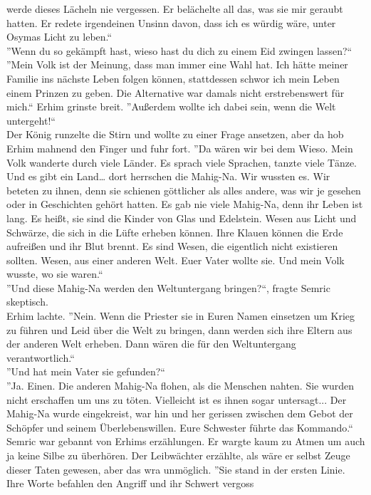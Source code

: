 werde dieses Lächeln nie vergessen. Er belächelte all das, was sie mir geraubt hatten. Er redete 
irgendeinen Unsinn davon, dass ich es würdig wäre, unter Osymas Licht zu leben.``\\
''Wenn du so gekämpft hast, wieso hast du dich zu einem Eid zwingen lassen?``\\
''Mein Volk ist der Meinung, dass man immer eine Wahl hat. Ich hätte meiner Familie ins nächste 
Leben 
folgen können, stattdessen schwor ich mein Leben einem Prinzen zu geben. Die Alternative war damals 
nicht erstrebenswert für mich.`` Erhim grinste breit. ''Außerdem wollte ich dabei sein, wenn die 
Welt 
untergeht!``\\
Der König runzelte die Stirn und wollte zu einer Frage ansetzen, aber da hob Erhim mahnend den 
Finger und fuhr fort. ''Da wären wir bei dem Wieso. Mein Volk wanderte durch viele Länder. Es 
sprach 
viele Sprachen, tanzte viele Tänze. Und es gibt ein Land… dort herrschen die Mahig-Na. Wir wussten 
es. Wir beteten zu ihnen, denn sie schienen göttlicher als alles andere, was wir je gesehen oder in 
Geschichten gehört hatten. Es gab nie viele Mahig-Na, denn ihr Leben ist lang. Es heißt, sie sind 
die Kinder von Glas und Edelstein. Wesen aus Licht und Schwärze, die sich in die Lüfte erheben 
können. Ihre Klauen können die Erde aufreißen und ihr Blut brennt. Es sind Wesen, die eigentlich 
nicht existieren sollten. Wesen, aus einer anderen Welt. Euer Vater wollte sie. Und mein Volk 
wusste, wo sie waren.``\\
''Und diese Mahig-Na werden den Weltuntergang bringen?``, fragte Semric skeptisch.\\
Erhim lachte. ''Nein. Wenn die Priester sie in Euren Namen einsetzen um Krieg zu führen und Leid 
über 
die Welt zu bringen, dann werden sich ihre Eltern aus der anderen Welt erheben. Dann wären die für 
den Weltuntergang verantwortlich.``\\
''Und hat mein Vater sie gefunden?``\\
''Ja. Einen. Die anderen Mahig-Na flohen, als die Menschen nahten. Sie wurden nicht erschaffen um 
uns zu töten. Vielleicht ist es ihnen sogar untersagt... Der Mahig-Na wurde eingekreist, war hin 
und her gerissen zwischen dem Gebot der Schöpfer und seinem Überlebenswillen. Eure Schwester führte 
das Kommando.``\\
Semric war gebannt von Erhims erzählungen. Er wargte kaum zu Atmen um auch ja keine Silbe zu 
überhören. Der Leibwächter erzählte, als wäre er selbst Zeuge dieser Taten gewesen, aber das wra 
unmöglich. ''Sie stand in der ersten Linie. Ihre Worte befahlen den Angriff und ihr Schwert vergoss 

